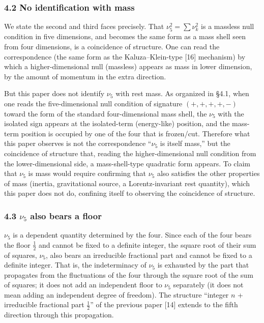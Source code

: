 \documentclass[
]{article}
\begin{document}
\subsubsection{4.2 No identification with
mass}\label{no-identification-with-mass}

We state the second and third faces precisely. That
\(\nu_5^2=\sum\nu_k^2\) is a massless null condition in five dimensions,
and becomes the same form as a mass shell seen from four dimensions, is
a coincidence of structure. One can read the correspondence (the same
form as the Kaluza--Klein-type {[}16{]} mechanism) by which a
higher-dimensional null (massless) appears as mass in lower dimension,
by the amount of momentum in the extra direction.

But this paper does not identify \(\nu_5\) with rest mass. As organized
in §4.1, when one reads the five-dimensional null condition of signature
\((+,+,+,+,-)\) toward the form of the standard four-dimensional mass
shell, the \(\nu_5\) with the isolated sign appears at the isolated-term
(energy-like) position, and the mass-term position is occupied by one of
the four that is frozen/cut. Therefore what this paper observes is not
the correspondence ``\(\nu_5\) is itself mass,'' but the coincidence of
structure that, reading the higher-dimensional null condition from the
lower-dimensional side, a mass-shell-type quadratic form appears. To
claim that \(\nu_5\) is mass would require confirming that \(\nu_5\)
also satisfies the other properties of mass (inertia, gravitational
source, a Lorentz-invariant rest quantity), which this paper does not
do, confining itself to observing the coincidence of structure.

\subsubsection{\texorpdfstring{4.3 \(\nu_5\) also bears a
floor}{4.3 \textbackslash nu\_5 also bears a floor}}\label{nu_5-also-bears-a-floor}

\(\nu_5\) is a dependent quantity determined by the four. Since each of
the four bears the floor \(\tfrac12\) and cannot be fixed to a definite
integer, the square root of their sum of squares, \(\nu_5\), also bears
an irreducible fractional part and cannot be fixed to a definite
integer. That is, the indeterminacy of \(\nu_5\) is exhausted by the
part that propagates from the fluctuations of the four through the
square root of the sum of squares; it does not add an independent floor
to \(\nu_5\) separately (it does not mean adding an independent degree
of freedom). The structure ``integer \(n\) + irreducible fractional part
\(\tfrac12\)'' of the previous paper {[}14{]} extends to the fifth
direction through this propagation.
\end{document}
